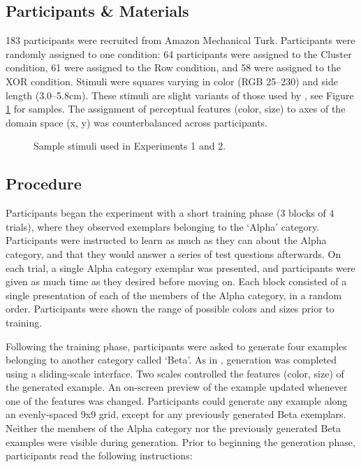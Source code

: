\documentclass[12pt]{article}
\newcommand\inputpgf[2]{{
\let\pgfimageWithoutPath\pgfimage
\renewcommand{\pgfimage}[2][]{\pgfimageWithoutPath[##1]{#1/##2}}

}}
\begin{document}
\begin{flushleft}
\subsection{Participants \& Materials}

183 participants were recruited from Amazon Mechanical Turk. Participants were randomly assigned to one condition: 64 participants were assigned to the Cluster condition, 61 were assigned to the Row condition, and 58 were assigned to the XOR condition. Stimuli were squares varying in color (RGB 25--230) and side length (3.0--5.8cm). These stimuli are slight variants of those used by \cite{conaway2016similar}, see Figure \ref{fig:sample-stimuli} for samples. The assignment of perceptual features (color, size) to axes of the domain space (x, y) was counterbalanced across participants.

\begin{figure}
    \begin{center}
    \inputpgf{figs/}{stimuli-samples.pgf}
    \caption{Sample stimuli used in Experiments 1 and 2.}
    \label{fig:sample-stimuli}
    \end{center}
\end{figure}

\subsection{Procedure}

Participants began the experiment with a short training phase (3 blocks of 4 trials), where they observed exemplars belonging to the `Alpha' category. Participants were instructed to learn as much as they can about the Alpha category, and that they would answer a series of test questions afterwards. On each trial, a single Alpha category exemplar was presented, and participants were given as much time as they desired before moving on. Each block consisted of a single presentation of each of the members of the Alpha category, in a random order. Participants were shown the range of possible colors and sizes prior to training.

Following the training phase, participants were asked to generate four examples belonging to another category called `Beta'. As in \citet{jern2013probabilistic}, generation was completed using a sliding-scale interface. Two scales controlled the features (color, size) of the generated example. An on-screen preview of the example updated whenever one of the features was changed. Participants could generate any example along an evenly-spaced 9x9 grid, except for any previously generated Beta exemplars. Neither the members of the Alpha category nor the previously generated Beta examples were visible during generation. Prior to beginning the generation phase, participants read the following instructions:


\end{flushleft}
\end{document}
